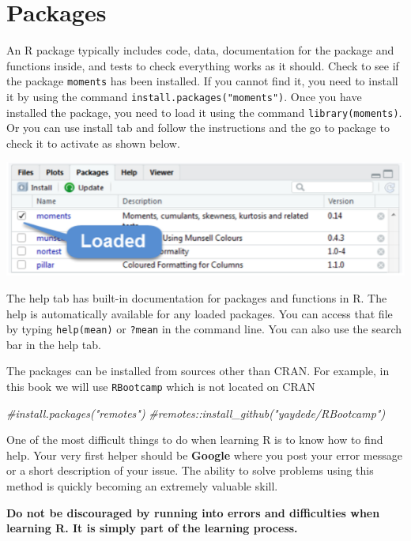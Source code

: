 \documentclass[
]{book}
\newenvironment{Shaded}{\begin{snugshade}}{\end{snugshade}}
\newcommand{\CommentTok}[1]{\textcolor[rgb]{0.56,0.35,0.01}{\textit{#1}}}
\begin{document}
\hypertarget{packages}{%
\section{Packages}\label{packages}}

An R package typically includes code, data, documentation for the package and functions inside, and tests to check everything works as it should. Check to see if the package \texttt{moments} has been installed. If you cannot find it, you need to install it by using the command \texttt{install.packages("moments")}. Once you have installed the package, you need to load it using the command \texttt{library(moments)}. Or you can use install tab and follow the instructions and the go to package to check it to activate as shown below.

\includegraphics[width=8.12in]{png/Rstudio4}

The help tab has built-in documentation for packages and functions in R. The help is automatically available for any loaded packages. You can access that file by typing \texttt{help(mean)} or \texttt{?mean} in the command line. You can also use the search bar in the help tab.

The packages can be installed from sources other than CRAN. For example, in this book we will use \texttt{RBootcamp} which is not located on CRAN

\begin{Shaded}
\begin{Highlighting}[]
\CommentTok{\#install.packages("remotes")}
\CommentTok{\#remotes::install\_github("yaydede/RBootcamp")}
\end{Highlighting}
\end{Shaded}

One of the most difficult things to do when learning R is to know how to find help. Your very first helper should be \textbf{Google} where you post your error message or a short description of your issue. The ability to solve problems using this method is quickly becoming an extremely valuable skill.

\textbf{Do not be discouraged by running into errors and difficulties when learning R. It is simply part of the learning process.}
\end{document}
